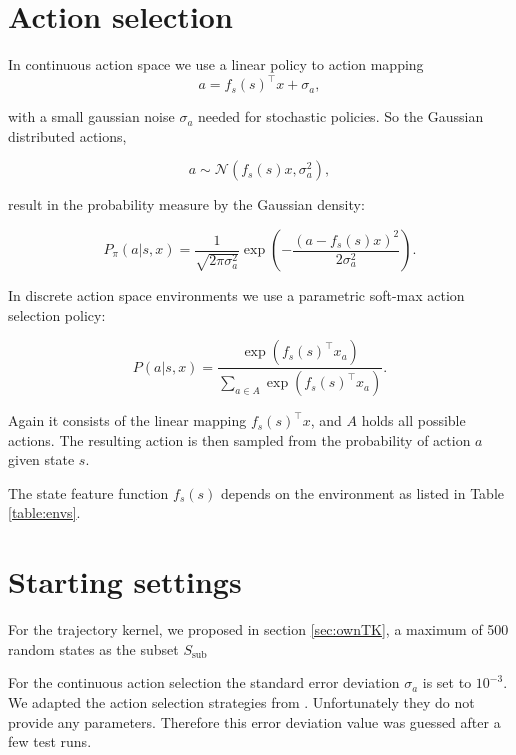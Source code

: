 \section{Action selection}
\label{sec:actionselection}
In continuous action space we use a linear policy to action mapping
\begin{equation} \label{eq:actionselection}
    a = f_s(s)^\top x + \sigma_a,
\end{equation}

with a small gaussian noise $\sigma_a$ needed for stochastic policies. So the Gaussian distributed actions,

$$a \sim \mathcal{N}(f_s(s) x,\sigma_a^2),$$

result in the probability measure by the Gaussian density:

\begin{equation}\label{eq:contiAS}
    P_{\pi}(a|s,x) = \frac{1}{\sqrt{2\pi\sigma_a^2}}\exp\left(-\frac{(a-f_s(s)x)^2}{2\sigma_a^2}\right).
\end{equation}

In discrete action space environments we use a parametric soft-max action selection policy:

\begin{equation} \label{eq:discreteactionselection}
    P(a|s,x)= \frac{\exp(f_s(s)^\top x_a)}{\sum_{a\in A} \exp(f_s(s)^\top x_a)}.
\end{equation}

Again it consists of the linear mapping $f_s(s)^\top x$, and $A$ holds all possible actions. The resulting action is then sampled from the probability of action $a$ given state $s$.

The state feature function $f_s(s)$ depends on the environment as listed in Table \ref{table:envs}.

\section{Starting settings}

For the trajectory kernel, we proposed in section \ref{sec:ownTK}, a maximum of 500 random states as the subset $S_{\text{sub}}$

For the continuous action selection the standard error deviation $\sigma_a$ is set to $10^{-3}$. We adapted the action selection strategies from \cite{wilson2014using}. Unfortunately they do not provide any parameters. Therefore this error deviation value was guessed after a few test runs.

